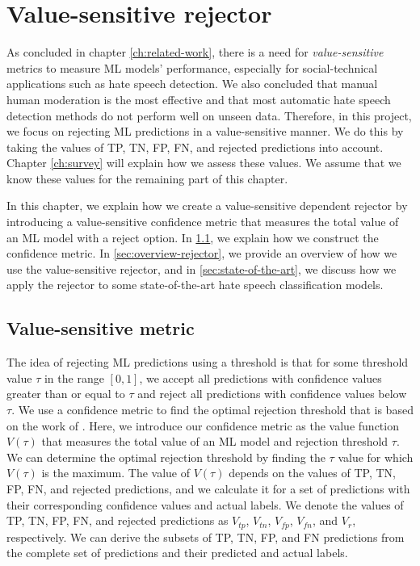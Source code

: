 \chapter{Value-sensitive rejector}
\label{ch:rejector}
As concluded in chapter \ref{ch:related-work}, there is a need for \textit{value-sensitive} metrics to measure ML models' performance, especially for social-technical applications such as hate speech detection.
%
We also concluded that manual human moderation is the most effective and that most automatic hate speech detection methods do not perform well on unseen data.
%
Therefore, in this project, we focus on rejecting ML predictions in a value-sensitive manner.
%
We do this by taking the values of TP, TN, FP, FN, and rejected predictions into account.
%
%
Chapter \ref{ch:survey} will explain how we assess these values.
%
We assume that we know these values for the remaining part of this chapter.
%

%
In this chapter, we explain how we create a value-sensitive dependent rejector by introducing a value-sensitive confidence metric that measures the total value of an ML model with a reject option.
%
In \ref{sec:value-metric}, we explain how we construct the confidence metric.
%
In \ref{sec:overview-rejector}, we provide an overview of how we use the value-sensitive rejector, and in \ref{sec:state-of-the-art}, we discuss how we apply the rejector to some state-of-the-art hate speech classification models.

\section{Value-sensitive metric}
\label{sec:value-metric}
The idea of rejecting ML predictions using a threshold is that for some threshold value $\tau$ in the range $[0, 1]$, we accept all predictions with confidence values greater than or equal to $\tau$ and reject all predictions with confidence values below $\tau$.
%
We use a confidence metric to find the optimal rejection threshold that is based on the work of \citet{de2000reject}.
%
Here, we introduce our confidence metric as the value function $V(\tau)$ that measures the total value of an ML model and rejection threshold $\tau$.
%
We can determine the optimal rejection threshold by finding the $\tau$ value for which $V(\tau)$ is the maximum.
%
The value of $V(\tau)$ depends on the values of TP, TN, FP, FN, and rejected predictions, and we calculate it for a set of predictions with their corresponding confidence values and actual labels.
%
We denote the values of TP, TN, FP, FN, and rejected predictions as $V_{tp}$, $V_{tn}$, $V_{fp}$, $V_{fn}$, and $V_r$, respectively.
%
We can derive the subsets of TP, TN, FP, and FN predictions from the complete set of predictions and their predicted and actual labels.
%


